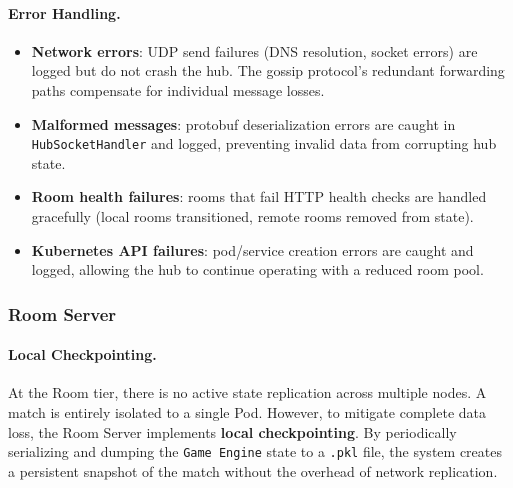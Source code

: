 \paragraph{Error Handling.}
\begin{itemize}
  \item \textbf{Network errors}: UDP send failures (DNS resolution, socket errors) are logged but do not crash the hub. The gossip protocol's redundant forwarding paths compensate for individual message losses.
  \item \textbf{Malformed messages}: protobuf deserialization errors are caught in \texttt{HubSocketHandler} and logged, preventing invalid data from corrupting hub state.
  \item \textbf{Room health failures}: rooms that fail HTTP health checks are handled gracefully (local rooms transitioned, remote rooms removed from state).
  \item \textbf{Kubernetes API failures}: pod/service creation errors are caught and logged, allowing the hub to continue operating with a reduced room pool.
\end{itemize}

\subsubsection{Room Server}

\paragraph{Local Checkpointing.}
At the Room tier, there is no active state replication across multiple nodes. 
A match is entirely isolated to a single Pod. However, to mitigate complete data loss, the Room Server implements \textbf{local checkpointing}. 
By periodically serializing and dumping the \texttt{Game Engine} state to a \texttt{.pkl} file, the system creates a persistent snapshot of the match without the overhead of network replication.

